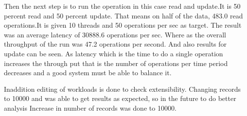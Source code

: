 \documentclass{bigdata}
\begin{document}
 Then the next step is to run the operation in this case read and update.It is 50 percent read and 50 percent update.  That means on half of the data, 483.0 read operations.It is given 10 threads and 50 operations per sec as target. The result was an average latency of 30888.6 operations per sec. Where as the overall throughput of the run was 47.2 operations per second. And also results for update can be seen. As latency which is the time to do a single operation increases the through put that is the number of operations per time period decreases and a good system must be able to balance it.  

Inaddition editing of workloads is done to check extensibility. Changing records to 10000 and was able to get results as expected, so in the future to do better analysis Increase in number of records was done to 10000.
\end{document}
